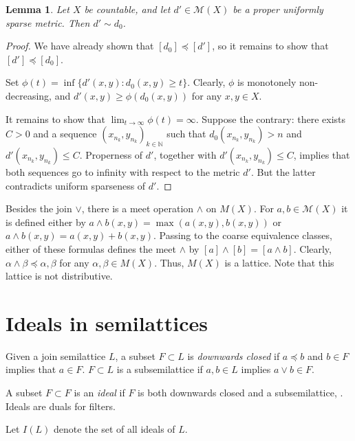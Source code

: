 \documentclass[reqno,12pt]{amsart}
\theoremstyle{plain}%
\newtheorem{lem}[thm]{Lemma}
\theoremstyle{definition}
\theoremstyle{remark}
\numberwithin{equation}{section}
\begin{document}
\begin{lem}\label{L3}
Let $X$ be countable, and let $d'\in\mathcal M(X)$ be a proper uniformly sparse metric. Then $d'\sim d_0$.

\end{lem}
\begin{proof}
We have already shown that $[d_0]\preceq[d']$, so it remains to show that $[d']\preceq[d_0]$.

Set $\phi(t)=\inf\{d'(x,y):d_0(x,y)\geq t\}$. Clearly, $\phi$ is monotonely non-decreasing, and $d'(x,y)\geq\phi(d_0(x,y))$ for any $x,y\in X$. 


It remains to show that $\lim_{t\to\infty}\phi(t)=\infty$. Suppose the contrary: there exists $C>0$ and a sequence $(x_{n_k},y_{n_k})_{k\in\mathbb N}$ such that $d_0(x_{n_k},y_{n_k})>n$ and $d'(x_{n_k},y_{n_k})\leq C$. Properness of $d'$, together with $d'(x_{n_k},y_{n_k})\leq C$, implies that both sequences go to infinity with respect to the metric $d'$. But the latter contradicts uniform sparseness of $d'$.
\end{proof}




Besides the join $\lor$, there is a meet operation $\land$ on $M(X)$. For $a,b\in\mathcal M(X)$ it is defined either by $a\land b(x,y)=\max(a(x,y),b(x,y))$ or $a\land b(x,y)=a(x,y)+b(x,y)$. Passing to the coarse equivalence classes, either of these formulas defines the meet $\land$ by $[a]\land[b]=[a\land b]$. Clearly, $\alpha\land\beta\preceq\alpha,\beta$ for any $\alpha,\beta\in M(X)$. Thus, $M(X)$ is a lattice. Note that this lattice is not distributive.   


\section{Ideals in semilattices}

Given a join semilattice $L$, a subset $F\subset L$ is \emph{downwards closed} if $a\preceq b$ and $b\in F$ implies that $a\in F$. $F\subset L$ is a subsemilattice if $a,b\in L$ implies $a\lor b\in F$. 

A subset $F\subset F$ is an \emph{ideal} if $F$ is both downwards closed and a subsemilattice, \cite{book}.
Ideals are duals for filters.


Let $I(L)$ denote the set of all ideals of $L$.
\end{document}
